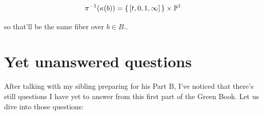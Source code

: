 \documentclass[12pt]{memoir}
\begin{document}
\begin{ptcbp}
    \[\pi^{-1}(\kappa(b))=\{\,[t,0,1,\infty]\,\}\times\mathbb{P}^1\]

    so that'll be the same fiber over \(b\in B\)..
\end{ptcbp}

\section{Yet unanswered questions}

After talking with my sibling preparing for his Part B, I've noticed that there's still questions I have yet to answer from this first part of the Green Book. Let us dive into those questions:
\end{document}
